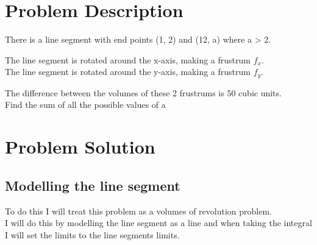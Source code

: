 \documentclass{article}
\begin{document}
\section{Problem Description}
There is a line segment with end points (1, 2) and (12, a) where a > 2.

The line segment is rotated around the x-axis, making a frustrum $f_x$.\\
The line segment is rotated around the y-axis, making a frustrum $f_y$.

The difference between the volumes of these 2 frustrums is 50 cubic units.\\
Find the sum of all the possible values of a

\section{Problem Solution}

\subsection{Modelling the line segment}
To do this I will treat this problem as a volumes of revolution problem.\\
I will do this by modelling the line segment as a line and when taking the integral I will
set the limits to the line segments limits.
\end{document}
